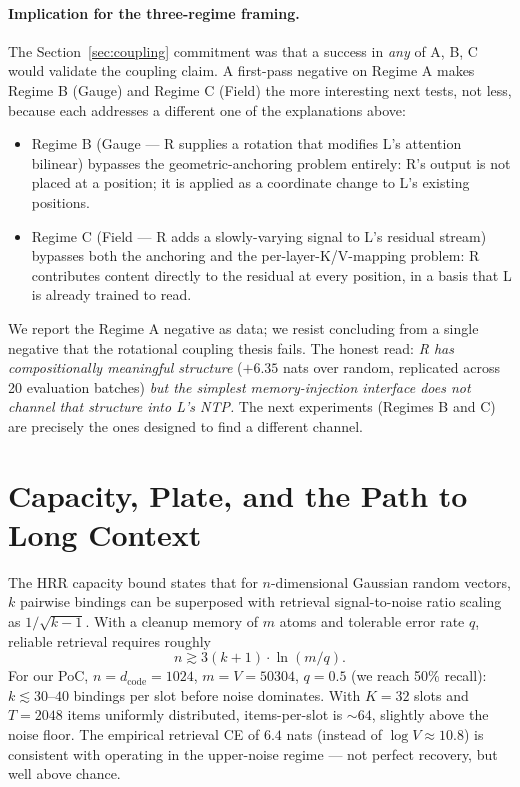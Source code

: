 \documentclass[10pt, twocolumn, a4paper]{article}
\begin{document}
\paragraph{Implication for the three-regime framing.} The Section~\ref{sec:coupling} commitment was that a success in \emph{any} of A, B, C would validate the coupling claim. A first-pass negative on Regime A makes Regime B (Gauge) and Regime C (Field) the more interesting next tests, not less, because each addresses a different one of the explanations above:

\begin{itemize}[nosep,leftmargin=1.5em]
\item Regime B (Gauge --- R supplies a rotation that modifies L's attention bilinear) bypasses the geometric-anchoring problem entirely: R's output is not placed at a position; it is applied as a coordinate change to L's existing positions.
\item Regime C (Field --- R adds a slowly-varying signal to L's residual stream) bypasses both the anchoring and the per-layer-K/V-mapping problem: R contributes content directly to the residual at every position, in a basis that L is already trained to read.
\end{itemize}

We report the Regime A negative as data; we resist concluding from a single negative that the rotational coupling thesis fails. The honest read: \emph{R has compositionally meaningful structure} ($+6.35$ nats over random, replicated across 20 evaluation batches) \emph{but the simplest memory-injection interface does not channel that structure into L's NTP.} The next experiments (Regimes B and C) are precisely the ones designed to find a different channel.



\section{Capacity, Plate, and the Path to Long Context}
\label{sec:capacity}

The HRR capacity bound \cite{plate1995hrr} states that for $n$-dimensional Gaussian random vectors, $k$ pairwise bindings can be superposed with retrieval signal-to-noise ratio scaling as $1/\sqrt{k-1}$. With a cleanup memory of $m$ atoms and tolerable error rate $q$, reliable retrieval requires roughly
\[
n \gtrsim 3(k+1) \cdot \ln(m/q).
\]
For our PoC, $n = d_{\text{code}} = 1024$, $m = V = 50304$, $q = 0.5$ (we reach 50\% recall): $k \lesssim 30\text{--}40$ bindings per slot before noise dominates. With $K=32$ slots and $T=2048$ items uniformly distributed, items-per-slot is $\sim 64$, slightly above the noise floor. The empirical retrieval CE of $6.4$ nats (instead of $\log V \approx 10.8$) is consistent with operating in the upper-noise regime --- not perfect recovery, but well above chance.
\end{document}
